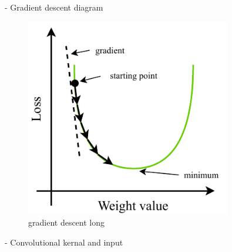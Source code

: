- Gradient descent diagram
\begin{figure}
    \includegraphics[width=0.8\textwidth]{diagrams/6-cvn/gradient_descent.pdf}
    \caption[gradient descent short]{gradient descent long}
    \label{fig:gradient_descent}
\end{figure}
- Convolutional kernal and input
